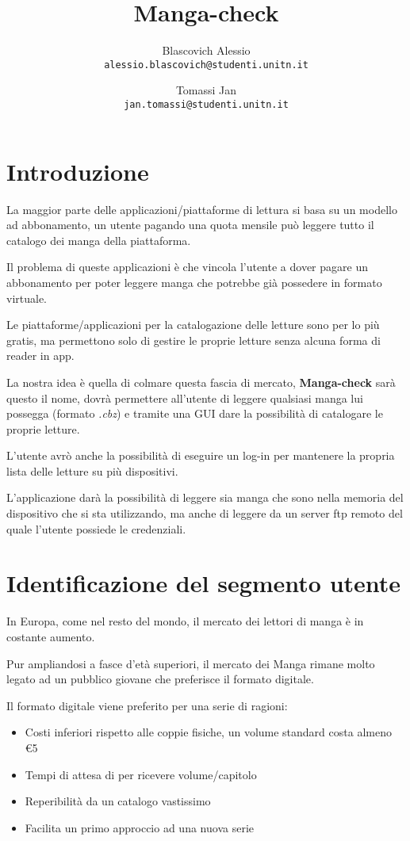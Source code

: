 \documentclass{report}
\title{Manga-check}
\author{Blascovich Alessio\\
	\texttt{alessio.blascovich@studenti.unitn.it}
	\and
	Tomassi Jan\\
	\texttt{jan.tomassi@studenti.unitn.it}}
\begin{document}
\maketitle

\tableofcontents

\newpage

\section{Introduzione}

La maggior parte delle applicazioni/piattaforme di lettura si basa su un
modello ad abbonamento, un utente pagando una quota mensile può leggere
tutto il catalogo dei manga della piattaforma.

Il problema di queste applicazioni è che vincola l'utente a dover pagare
un abbonamento per poter leggere manga che potrebbe già possedere in
formato virtuale.

Le piattaforme/applicazioni per la catalogazione delle letture sono per
lo più gratis, ma permettono solo di gestire le proprie letture senza
alcuna forma di reader in app.

La nostra idea è quella di colmare questa fascia di mercato,
\textbf{Manga-check} sarà questo il nome, dovrà permettere all'utente di
leggere qualsiasi manga lui possegga (formato \emph{.cbz}) e tramite una GUI
dare la possibilità di catalogare le proprie letture.

L'utente avrò anche la possibilità di eseguire un log-in per mantenere
la propria lista delle letture su più dispositivi.

L'applicazione darà la possibilità di leggere sia manga che sono nella
memoria del dispositivo che si sta utilizzando, ma anche di leggere da
un server ftp remoto del quale l'utente possiede le credenziali.

\section{Identificazione del segmento utente}

In Europa, come nel resto del mondo, il mercato dei lettori di manga è
in costante aumento\cite{mangaOut}.

Pur ampliandosi a fasce d'età superiori, il mercato dei Manga rimane
molto legato ad un pubblico giovane che preferisce il formato digitale.

Il formato digitale viene preferito per una serie di ragioni:

\begin{itemize}
	\item Costi inferiori rispetto alle coppie fisiche, un volume standard costa almeno \euro{5}
	\item Tempi di attesa di per ricevere volume/capitolo
	\item Reperibilità da un catalogo vastissimo
	\item Facilita un primo approccio ad una nuova serie
\end{itemize}
\end{document}
